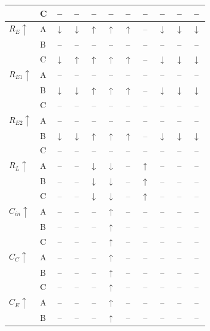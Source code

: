 \documentclass[11pt, a4paper]{article}
\begin{document}
{\begin{longtable}{llccccccccc}
    & C & -- & -- & -- & -- & -- & -- & -- & -- & -- \\
    \midrule
    $R_E \uparrow$
    & A & $\downarrow$ & $\downarrow$ & $\uparrow$ & $\uparrow$ & $\uparrow$ & -- & $\downarrow$ & $\downarrow$ & $\downarrow$ \\
    & B & -- & -- & -- & -- & -- & -- & -- & -- & -- \\
    & C & $\downarrow$ & $\uparrow$ & $\uparrow$ & $\uparrow$ & $\uparrow$ & -- & $\downarrow$ & $\downarrow$ & $\downarrow$ \\
    \midrule
    $R_{E1} \uparrow$
    & A & -- & -- & -- & -- & -- & -- & -- & -- & -- \\
    & B & $\downarrow$ & $\downarrow$ & $\uparrow$ & $\uparrow$ & $\uparrow$ & -- & $\downarrow$ & $\downarrow$ & $\downarrow$ \\
    & C & -- & -- & -- & -- & -- & -- & -- & -- & -- \\
    \midrule
    $R_{E2} \uparrow$
    & A & -- & -- & -- & -- & -- & -- & -- & -- & -- \\
    & B & $\downarrow$ & $\downarrow$ & $\uparrow$ & $\uparrow$ & $\uparrow$ & -- & $\downarrow$ & $\downarrow$ & $\downarrow$ \\
    & C & -- & -- & -- & -- & -- & -- & -- & -- & -- \\
    \midrule
    $R_L \uparrow$
    & A & -- & -- & $\downarrow$ & $\downarrow$ & -- & $\uparrow$ & -- & -- & -- \\
    & B & -- & -- & $\downarrow$ & $\downarrow$ & -- & $\uparrow$ & -- & -- & -- \\
    & C & -- & -- & $\downarrow$ & $\downarrow$ & -- & $\uparrow$ & -- & -- & -- \\
    \midrule
    $C_{in} \uparrow$
    & A & -- & -- & -- & $\uparrow$ & -- & -- & -- & -- & -- \\
    & B & -- & -- & -- & $\uparrow$ & -- & -- & -- & -- & -- \\
    & C & -- & -- & -- & $\uparrow$ & -- & -- & -- & -- & -- \\
    \midrule
    $C_C \uparrow$
    & A & -- & -- & -- & $\uparrow$ & -- & -- & -- & -- & -- \\
    & B & -- & -- & -- & $\uparrow$ & -- & -- & -- & -- & -- \\
    & C & -- & -- & -- & $\uparrow$ & -- & -- & -- & -- & -- \\
    \midrule
    $C_E \uparrow$
    & A & -- & -- & -- & $\uparrow$ & -- & -- & -- & -- & -- \\
    & B & -- & -- & -- & $\uparrow$ & -- & -- & -- & -- & -- \\

\end{longtable}}
\end{document}
